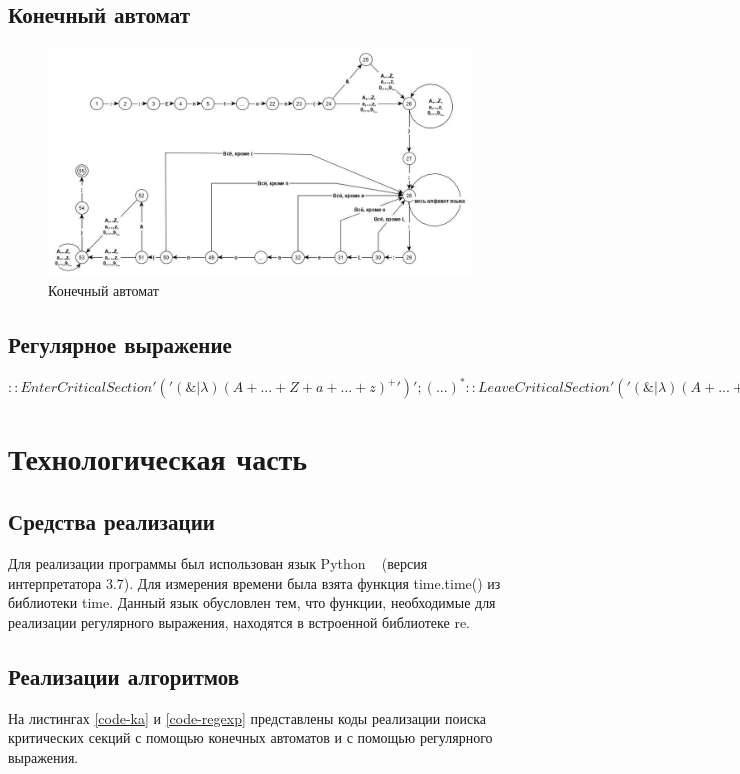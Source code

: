 \documentclass[12pt, a4paper]{report}
\begin{document}
	\section{Конечный автомат}
	\begin{figure}[ht!]
		\centering
		\includegraphics[width=1\linewidth]{ka.jpg}
		\caption{Конечный автомат}
		\label{ris:ka}
	\end{figure}

	\section{Регулярное выражение}
	$::EnterCriticalSection'(' (\&|\lambda) (A+...+Z+a+...+z)^{+} ')';(...)^*
	::LeaveCriticalSection'(' (\&|\lambda) (A+...+Z+a+...+z)^{+} ')';$

	\chapter{Технологическая часть}
	\section{Средства реализации}
	\hspace{0.5cm}Для реализации программы был использован язык Python ~\cite{py} (версия интерпретатора 3.7). Для измерения времени была взята функция time.time() из
	библиотеки time. Данный язык обусловлен тем, что функции, необходимые для реализации регулярного выражения, находятся в встроенной библиотеке re.
	
	\section{Реализации алгоритмов}
	На листингах \ref{code-ka} и \ref{code-regexp} представлены коды реализации поиска критических секций с помощью конечных автоматов и с помощью регулярного выражения.
	
\end{document}
